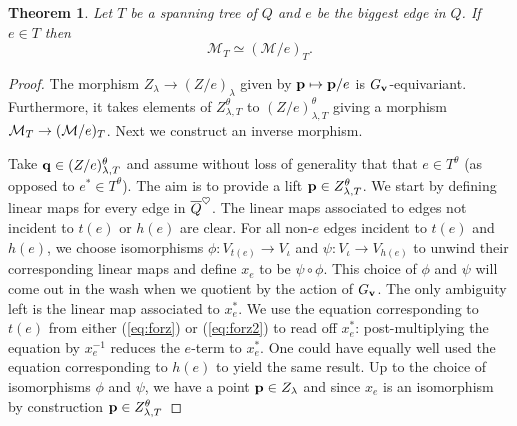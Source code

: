 \documentclass{amsart}
\newtheorem{thm}{Theorem}[section]
\theoremstyle{definition}
\begin{document}

\begin{thm}\label{thm:contract}
Let $T$ be a spanning tree of $Q$ and $e$ be the biggest edge in $Q$. 
If $e \in T$ then $$\mathcal{M}_T \simeq (\mathcal{M}/e)_T.$$
\end{thm}

\begin{proof}
The morphism $Z_\lambda \rightarrow (Z/e)_\lambda$ given by $\mathbf{p} \mapsto \mathbf{p}/e$ is $G_{\mathbf{v}}$-equivariant.
Furthermore, it takes elements of $Z_{\lambda,T}^\theta$ to $(Z/e)_{\lambda,T}^\theta$  giving a morphism $\mathcal{M}_T \rightarrow (\mathcal{M}/e)_T$. 
Next we construct an inverse morphism.

Take $\mathbf{q} \in (Z/e)_{\lambda,T}^\theta$ and assume without loss of generality that that $e \in T^\theta$ (as opposed to $e^* \in T^\theta$). 
The aim is to provide a lift $\mathbf{p} \in Z_{\lambda,T}^\theta$.
We start by defining linear maps for every edge in ${\overline{Q}}^\heartsuit$.
The linear maps associated to edges not incident to $t(e)$ or $h(e)$ are clear.
For all non-$e$ edges incident to $t(e)$ and $h(e)$, we choose isomorphisms $\phi \colon V_{t(e)} \rightarrow V_\iota$ and $\psi \colon V_\iota \rightarrow V_{h(e)}$ to unwind their corresponding linear maps and define $x_e$ to be $\psi \circ \phi$.
This choice of $\phi$ and $\psi$ will come out in the wash when we quotient by the action of $G_{\mathbf{v}}$.
The only ambiguity left is the linear map associated to $x_e^*$.
We use the equation corresponding to $t(e)$ from either (\ref{eq:forz}) or (\ref{eq:forz2}) to read off $x_e^*$: post-multiplying the equation by $x_e^{-1}$ reduces the $e$-term to $x_e^*$.
One could have equally well used the equation corresponding to $h(e)$ to yield the same result.
Up to the choice of isomorphisms $\phi$ and $\psi$, we have a point $\mathbf{p} \in Z_\lambda$ and since $x_e$ is an isomorphism by construction $\mathbf{p} \in Z_{\lambda,T}^\theta$



\end{proof}
\end{document}

